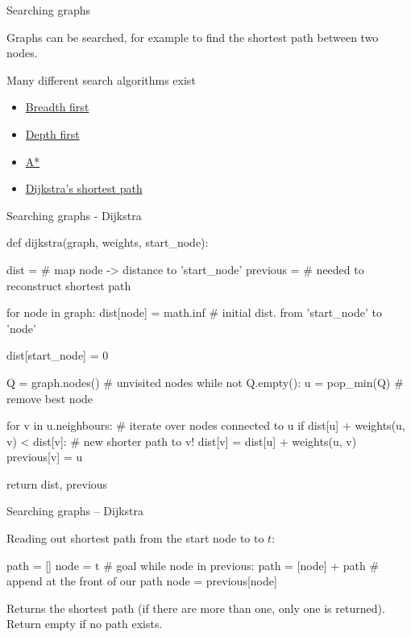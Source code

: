 \documentclass[compress]{beamer}
\begin{document}
\begin{frame}{Searching graphs}

Graphs can be searched, for example to find the shortest path between
two nodes.

Many different search algorithms exist

\begin{itemize}
\item \href{http://en.wikipedia.org/wiki/Breadth-first_search}{Breadth
  first}
\item \href{http://en.wikipedia.org/wiki/Depth-first_search}{Depth first}
\item \href{http://en.wikipedia.org/wiki/A*_search_algorithm}{A*}
\item \href{http://en.wikipedia.org/wiki/Dijkstra's_algorithm}{Dijkstra's
  shortest path}
\end{itemize}

\end{frame}

\begin{frame}[fragile]{Searching graphs - Dijkstra}

\begin{pythoncode}
def dijkstra(graph, weights, start_node):

  dist = {} # map {node -> distance to 'start_node'}
  previous = {} # needed to reconstruct shortest path

  for node in graph:
    dist[node] = math.inf # initial dist. from 'start_node' to 'node'

  dist[start_node] = 0

  Q = graph.nodes() # unvisited nodes
  while not Q.empty():
    u = pop_min(Q) # remove best node

    for v in u.neighbours: # iterate over nodes connected to u
      if dist[u] + weights(u, v) < dist[v]: # new shorter path to v!
        dist[v] = dist[u] + weights(u, v)
        previous[v] = u

  return dist, previous
\end{pythoncode}
\end{frame}


\begin{frame}[fragile]{Searching graphs -- Dijkstra}

Reading out shortest path from the start node to to $t$:

\begin{pythoncode}
path = []
node = t # goal
while node in previous:
    path = [node] + path # append at the front of our path
    node = previous[node]
\end{pythoncode}

Returns the shortest path (if there are more than one, only one is returned).
Return empty if no path exists.

\end{frame}
\end{document}
